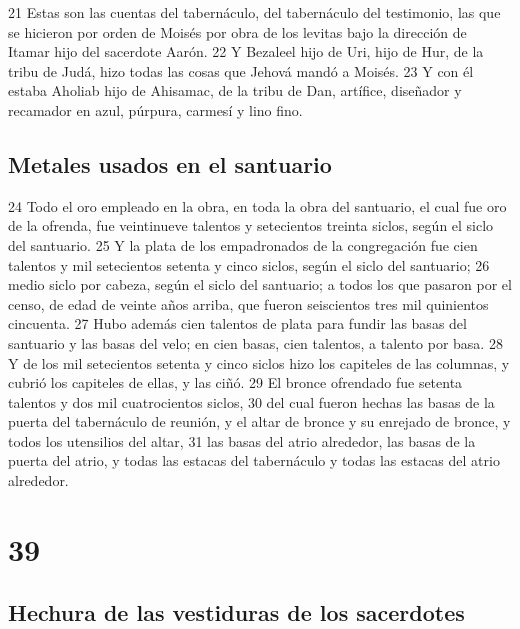 21 Estas son las cuentas del tabernáculo, del tabernáculo del testimonio, las que se hicieron por orden de Moisés por obra de los levitas bajo la dirección de Itamar hijo del sacerdote Aarón.
22 Y Bezaleel hijo de Uri, hijo de Hur, de la tribu de Judá, hizo todas las cosas que Jehová mandó a Moisés.
23 Y con él estaba Aholiab hijo de Ahisamac, de la tribu de Dan, artífice, diseñador y recamador en azul, púrpura, carmesí y lino fino.

\section{Metales usados en el santuario}

24 Todo el oro empleado en la obra, en toda la obra del santuario, el cual fue oro de la ofrenda, fue veintinueve talentos   y setecientos treinta siclos, según el siclo del santuario.
25 Y la plata de los empadronados de la congregación fue cien talentos   y mil setecientos setenta y cinco siclos, según el siclo del santuario;
26 medio siclo por cabeza, según el siclo del santuario; a todos los que pasaron por el censo, de edad de veinte años arriba, que fueron seiscientos tres mil quinientos cincuenta.
27 Hubo además cien talentos de plata   para fundir las basas del santuario y las basas del velo; en cien basas, cien talentos, a talento por basa.
28 Y de los mil setecientos setenta y cinco siclos   hizo los capiteles de las columnas, y cubrió los capiteles de ellas, y las ciñó.
29 El bronce ofrendado fue setenta talentos   y dos mil cuatrocientos siclos,
30 del cual fueron hechas las basas de la puerta del tabernáculo de reunión, y el altar de bronce y su enrejado de bronce, y todos los utensilios del altar,
31 las basas del atrio alrededor, las basas de la puerta del atrio, y todas las estacas del tabernáculo y todas las estacas del atrio alrededor.

\chapter{39}

\section{Hechura de las vestiduras de los sacerdotes}

